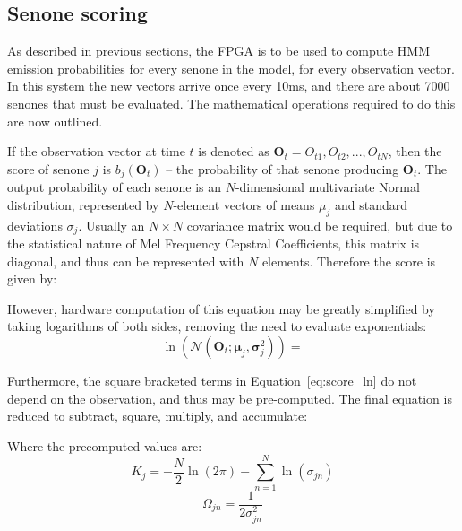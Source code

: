 	\subsection{Senone scoring} %
	\label{sub:senone_scoring}
		As described in previous sections, the FPGA is to be used to compute HMM emission probabilities for every senone in the model, for every observation vector.  In this system the new vectors arrive once every 10ms, and there are about 7000 senones that must be evaluated.  The mathematical operations required to do this are now outlined. %

		If the observation vector at time $t$ is denoted as $\textbf{O}_t = {O_{t1}, O_{t2}, ..., O_{tN}}$, then the score of senone $j$ is $b_j(\textbf{O}_t)$ -- the probability of that senone producing $\textbf{O}_t$.  The output probability of each senone is an $N$-dimensional multivariate Normal distribution, represented by $N$-element vectors of means $\mu_j$ and standard deviations $\sigma_j$.  Usually an $N\times N$ covariance matrix  would be required, but due to the statistical nature of Mel Frequency Cepstral Coefficients, this matrix is diagonal, and thus can be represented with $N$ elements.  Therefore the score is given by:

		However, hardware computation of this equation may be greatly simplified by taking logarithms of both sides, removing the need to evaluate exponentials:
		\[
		\ln(\mathcal{N}(\textbf{O}_t; \boldsymbol{\mu}_j,\boldsymbol{\sigma}_j^2))=
		\]

		Furthermore, the square bracketed terms in Equation~\ref{eq:score_ln} do not depend on the observation, and thus may be pre-computed.  The final equation is reduced to subtract, square, multiply, and accumulate:

		Where the precomputed values are:
		\[ K_j = - \frac{N}{2} \ln(2\pi) - \sum_{n=1}^N \ln(\sigma_{jn}) \]
		\[ \Omega_{jn} = \frac{1}{2\sigma_{jn}^2} \]

